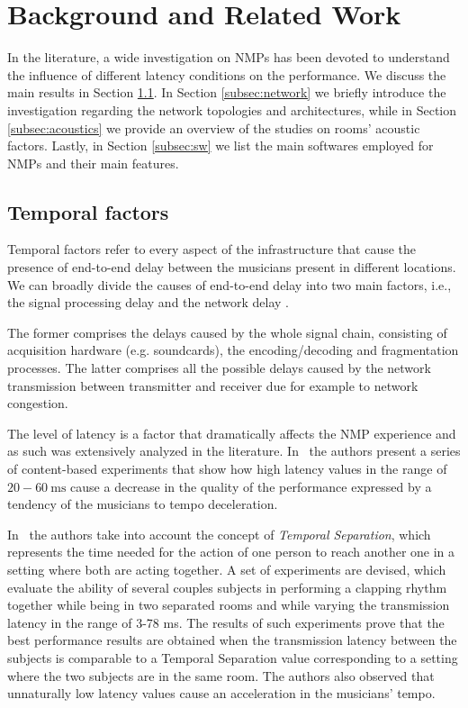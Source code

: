\section{Background and Related Work}\label{sec:background}
In the literature, a wide investigation on NMPs has been devoted to understand the influence of different latency conditions on the performance. We discuss the main results in Section \ref{subsec:temporal}. In Section \ref{subsec:network} we briefly introduce the investigation regarding the network topologies and architectures, while in Section \ref{subsec:acoustics} we provide an overview of the studies on rooms' acoustic factors. Lastly, in Section \ref{subsec:sw} we list the main softwares employed for NMPs and their main features.

\subsection{Temporal factors}\label{subsec:temporal}
Temporal factors refer to every aspect of the infrastructure that cause the presence of end-to-end delay between the musicians present in different locations. We can broadly divide the causes of end-to-end delay into two main factors, i.e., the signal processing delay and the network delay \cite{Lakiotakis}. 

The former comprises the delays caused by the whole signal chain, consisting of acquisition hardware (e.g. soundcards), the encoding/decoding and fragmentation processes. The latter comprises all the possible delays caused by the network transmission between transmitter and receiver due for example to network congestion.

The level of latency is a factor that dramatically affects the NMP experience and as such was extensively analyzed in the literature. In~\cite{RottondiFeature} the authors present a series of content-based experiments that show how high latency values in the range of $20-60~\mathrm{ms}$ cause a decrease in the quality of the performance expressed by a tendency of the musicians to tempo deceleration. 

In~\cite{Chafe1,Chafe2,Chafe3} the authors take into account the concept of \textit{Temporal Separation}, which represents the time needed for the action of one person to reach another one in a setting where both are acting together. A set of experiments are devised, which evaluate the ability of several couples subjects in performing a clapping rhythm together while being in two separated rooms and while varying the transmission latency in the range of 3-78 ms. The results of such experiments prove that the best performance results are obtained when the transmission latency between the subjects is comparable to a Temporal Separation value corresponding to a setting where the two subjects are in the same room. The authors also observed that unnaturally low latency values cause an acceleration in the musicians' tempo.


